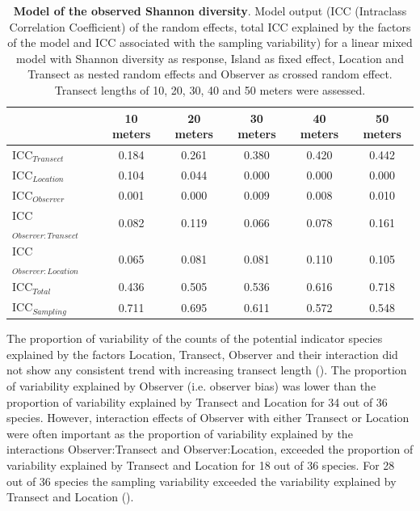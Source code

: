\documentclass[10pt,letterpaper]{article}
\begin{document}
\renewcommand{\arraystretch}{1.25}
\begin{table}
\centering
\scriptsize
\caption{{\bf Model of the observed Shannon diversity}. Model output (ICC (Intraclass Correlation Coefficient) of the random effects, total ICC explained by the factors of the model and ICC associated with the sampling variability) for a linear mixed model with Shannon diversity as response, Island as fixed effect, Location and Transect as nested random effects and Observer as crossed random effect. Transect lengths of 10, 20, 30, 40 and 50 meters were assessed.}
\label{mixed_model_H_ICC_Table_island_fixed}
\begin{tabular}{l|ccccc}
\toprule
                  & 10 meters & 20 meters & 30 meters & 40 meters & 50 meters  \\ 
\midrule
ICC$_{Transect}$          & 0.184    & 0.261    & 0.380    & 0.420    & 0.442     \\ 
ICC$_{Location}$          & 0.104    & 0.044    & 0.000    & 0.000    & 0.000     \\ 
ICC$_{Observer}$          & 0.001    & 0.000    & 0.009    & 0.008    & 0.010     \\ 
ICC$_{Observer:Transect}$ & 0.082    & 0.119    & 0.066    & 0.078    & 0.161     \\ 
ICC$_{Observer:Location}$ & 0.065    & 0.081    & 0.081    & 0.110    & 0.105     \\ 
ICC$_{Total}$             & 0.436    & 0.505    & 0.536    & 0.616    & 0.718     \\
ICC$_{Sampling}$             & 0.711    & 0.695    & 0.611    & 0.572    & 0.548     \\
\bottomrule
\end{tabular}
\end{table}
\renewcommand{\arraystretch}{1}

The proportion of variability of the counts of the potential indicator species explained by the factors Location, Transect, Observer and their interaction did not show any consistent trend with increasing transect length (). 
The proportion of variability explained by Observer (i.e. observer bias) was lower than the proportion of variability explained by Transect and Location for 34 out of 36 species. However, interaction effects of Observer with either Transect or Location were often important as the proportion of variability explained by the interactions Observer:Transect and Observer:Location, exceeded the proportion of variability explained by Transect and Location for 18 out of 36 species. For 28 out of 36 species the sampling variability exceeded the variability explained by Transect and Location (). 
\end{document}
